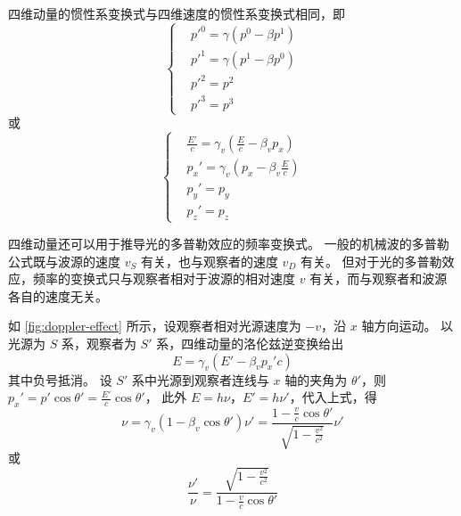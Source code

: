 四维动量的惯性系变换式与四维速度的惯性系变换式相同，即
\begin{equation}
    \left\{
    \begin{aligned}
         & p'^0 = \gamma (p^0 - \beta p^1) \\
         & p'^1 = \gamma (p^1 - \beta p^0) \\
         & p'^2 = p^2                      \\
         & p'^3 = p^3
    \end{aligned}
    \right.
\end{equation}
或
\begin{equation}
    \left\{
    \begin{aligned}
         & \frac{E'}{c} = \gamma_v \left( \frac{E}{c} - \beta_v p_x \right) \\
         & p_x' = \gamma_v (p_x - \beta_v \frac{E}{c})                      \\
         & p_y' = p_y                                                       \\
         & p_z' = p_z
    \end{aligned}
    \right.
\end{equation}

四维动量还可以用于推导光的多普勒效应的频率变换式。
一般的机械波的多普勒公式既与波源的速度 $v_S$ 有关，也与观察者的速度 $v_D$ 有关。
但对于光的多普勒效应，频率的变换式只与观察者相对于波源的相对速度 $v$ 有关，而与观察者和波源各自的速度无关。


如 \cref{fig:doppler-effect} 所示，设观察者相对光源速度为 $-v$，沿 $x$ 轴方向运动。
以光源为 $S$ 系，观察者为 $S'$ 系，四维动量的洛伦兹逆变换给出
\begin{equation}
    E = \gamma_v (E' - \beta_v p_x' c)
\end{equation}
其中负号抵消。
设 $S'$ 系中光源到观察者连线与 $x$ 轴的夹角为 $\theta'$，则 $p_x' = p' \cos \theta' = \frac{E'}{c} \cos \theta'$，
此外 $E = h \nu$，$E' = h \nu'$，代入上式，得
\begin{equation}
    \nu = \gamma_v (1 - \beta_v \cos \theta') \nu' = \frac{1 - \frac{v}{c} \cos \theta'}{\sqrt{1 - \frac{v^2}{c^2}}} \nu'
\end{equation}
或
\begin{equation}
    \frac{\nu'}{\nu} = \frac{\sqrt{1 - \frac{v^2}{c^2}}}{1 - \frac{v}{c} \cos \theta'}
\end{equation}

